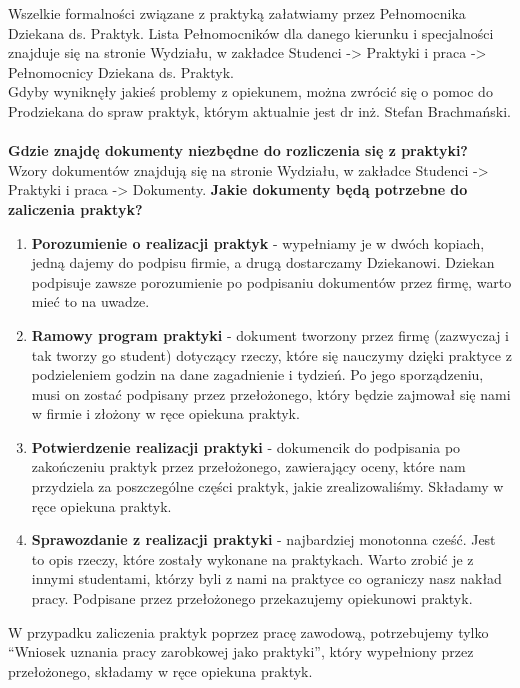 \documentclass[11pt]{article}
\begin{document}
\indent Wszelkie formalności związane z praktyką załatwiamy przez Pełnomocnika Dziekana ds. Praktyk. Lista Pełnomocników dla danego kierunku i specjalności znajduje się na stronie Wydziału, w zakładce Studenci -> Praktyki i praca -> Pełnomocnicy Dziekana ds. Praktyk. \\
\indent Gdyby wyniknęły jakieś problemy z opiekunem, można zwrócić się o pomoc do Prodziekana do spraw praktyk, którym aktualnie jest dr inż. Stefan Brachmański. \\\\
\textbf{Gdzie znajdę dokumenty niezbędne do rozliczenia się z praktyki?} \\
\indent Wzory dokumentów znajdują się na stronie Wydziału, w zakładce Studenci -> Praktyki i praca -> Dokumenty.
\newpage
\noindent \textbf{Jakie dokumenty będą potrzebne do zaliczenia praktyk?}
\begin{enumerate}
    \item \textbf{Porozumienie o realizacji praktyk} - wypełniamy je w dwóch kopiach, jedną dajemy do podpisu firmie, a drugą dostarczamy Dziekanowi. Dziekan podpisuje zawsze porozumienie po podpisaniu dokumentów przez firmę, warto mieć to na uwadze.
    \item \textbf{Ramowy program praktyki} - dokument tworzony przez firmę (zazwyczaj i tak tworzy go student) dotyczący rzeczy, które się nauczymy dzięki praktyce z podzieleniem godzin na dane zagadnienie i tydzień. Po jego sporządzeniu, musi on zostać podpisany przez przełożonego, który będzie zajmował się nami w firmie i złożony w ręce opiekuna praktyk.
    \item \textbf{Potwierdzenie realizacji praktyki} - dokumencik do podpisania po zakończeniu praktyk przez przełożonego, zawierający oceny, które nam przydziela za poszczególne części praktyk, jakie zrealizowaliśmy. Składamy w ręce opiekuna praktyk.
    \item \textbf{Sprawozdanie z realizacji praktyki} - najbardziej monotonna cześć. Jest to opis rzeczy, które zostały wykonane na praktykach. Warto zrobić je z innymi studentami, którzy byli z nami na praktyce co ograniczy nasz nakład pracy. Podpisane przez przełożonego przekazujemy opiekunowi praktyk.
\end{enumerate}
\indent \hspace{0.5cm} W przypadku zaliczenia praktyk poprzez pracę zawodową, potrzebujemy tylko “Wniosek uznania pracy zarobkowej jako praktyki”, który wypełniony przez przełożonego, składamy w ręce opiekuna praktyk. \\\\
\end{document}
